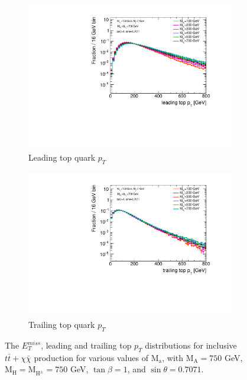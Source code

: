 \begin{figure}
  \begin{subfigure}[b]{0.45\textwidth}
    \includegraphics[width=\textwidth]{texinputs/04_grid/figures/DMHF/benchmarking/MDM_1_MA_750_sinp_0.7071_tanb_1.0_SCAN_Ma/top1ptlog.pdf}
    \caption{Leading top quark $p_{T}$}
  \end{subfigure} 
  \begin{subfigure}[b]{0.45\textwidth}
    \includegraphics[width=\textwidth]{texinputs/04_grid/figures/DMHF/benchmarking/MDM_1_MA_750_sinp_0.7071_tanb_1.0_SCAN_Ma/top2ptlog.pdf}
    \caption{Trailing top quark $p_{T}$}
  \end{subfigure}
  
  \caption{The $E_{T}^{miss}$, leading and trailing top $p_{T}$ distributions for inclusive $t\bar{t}+\chi\bar{\chi}$ production for various values of $\mathrm{M_a}$, with $\mathrm{M_A}=750$ GeV, $\mathrm{M_H}=\mathrm{M_{H^{\pm}}}=750$ GeV, $\tan\beta=1$, and $\sin\theta=0.7071$.\label{fig:kin_Ma}}
  
\end{figure}

